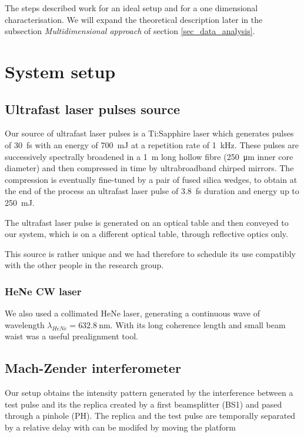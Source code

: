 \documentclass[12pt,a4paper,twoside]{article}
\begin{document}
The steps described work for an ideal setup and for a one dimensional characterisation.
We will expand the theoretical description later in the subsection \textit{Multidimensional approach} of section \ref{sec_data_analysis}.

\section{System setup}
\subsection{Ultrafast laser pulses source}
Our source of ultrafast laser pulses is a Ti:Sapphire laser which generates pulses of \SI{30}{\fs} with an energy of \SI{700}{\milli\J} at a repetition rate of \SI{1}{\kHz}.
These pulses are successively spectrally broadened in a \SI{1}{\m} long hollow fibre (\SI{250}{\um} inner core diameter) and then compressed in time by ultrabroadband chirped mirrors.
The compression is eventually fine-tuned by a pair of fused silica wedges, to obtain at the end of the process an ultrafast laser pulse of \SI{3.8}{\fs} duration and energy up to \SI{250}{\milli\J}.

The ultrafast laser pulse is generated on an optical table and then conveyed to our system, which is on a different optical table, through reflective optics only.

This source is rather unique and we had therefore to schedule its use compatibly with the other people in the research group.

\subsubsection*{HeNe CW laser}
We also used a collimated HeNe laser, generating a continuous wave of wavelength $\lambda_{HeNe}=\SI{632.8}{\nm}$.
With its long coherence length and small beam waist was a useful prealignment tool.

\subsection{Mach-Zender interferometer}
Our setup obtains the intensity pattern generated by the interference between a test pulse and its the replica created by a first beamsplitter (BS1) and pased through a pinhole (PH).
The replica and the test pulse are temporally separated by a relative delay with can be modifed by moving the platform
\end{document}
